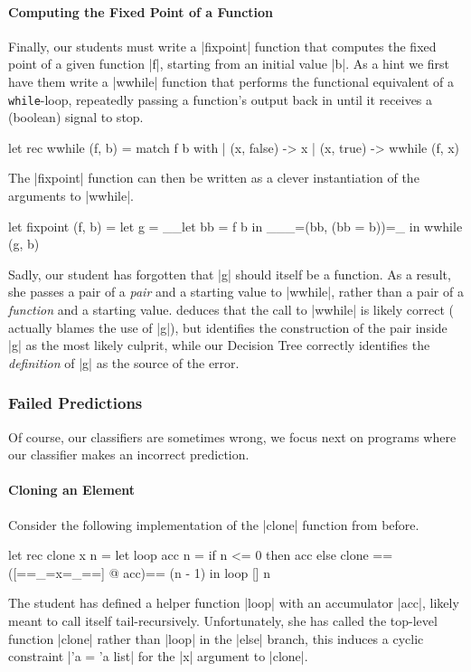 \paragraph{Computing the Fixed Point of a Function}
Finally, our students must write a |fixpoint| function that computes the
fixed point of a given function |f|, starting from an initial value |b|.
%
As a hint we first have them write a |wwhile| function that performs the
functional equivalent of a \texttt{while}-loop, repeatedly passing a function's
output back in until it receives a (boolean) signal to stop.
%
\begin{ecode}
  let rec wwhile (f, b) =
    match f b with
    | (x, false) -> x
    | (x, true)  -> wwhile (f, x)
\end{ecode}
\lstset{firstnumber=last}
%
The |fixpoint| function can then be written as a clever instantiation of
the arguments to |wwhile|.
%
\begin{ecode}
  let fixpoint (f, b) =
    let g = __let bb = f b in ___=(bb, (bb = b))=_ in
    wwhile (g, b)
\end{ecode}
\lstset{firstnumber=1}
%
Sadly, our student has forgotten that |g| should itself be a function.
%
As a result, she passes a pair of a \emph{pair} and a starting value to
|wwhile|, rather than a pair of a \emph{function} and a starting value.
%
\sherrloc deduces that the call to |wwhile| is likely correct (\ocaml
actually blames the use of |g|), but identifies the construction of the
pair inside |g| as the most likely culprit, while our Decision Tree
correctly identifies the \emph{definition} of |g| as the source of the
error.


\subsubsection{Failed Predictions}
\label{sec:failed-predictions}
Of course, our classifiers are sometimes wrong, we focus next on programs
where our classifier makes an incorrect prediction.

\paragraph{Cloning an Element}
Consider the following implementation of the |clone| function from
before.
%
\begin{ecode}
  let rec clone x n =
    let loop acc n =
      if n <= 0 then
        acc
      else
        clone ==([==_=x=_==] @ acc)== (n - 1) in
    loop [] n
\end{ecode}
%
The student has defined a helper function |loop| with an accumulator
|acc|, likely meant to call itself tail-recursively.
%
Unfortunately, she has called the top-level function |clone| rather than
|loop| in the |else| branch, this induces a cyclic constraint |'a = 'a list|
for the |x| argument to |clone|.

